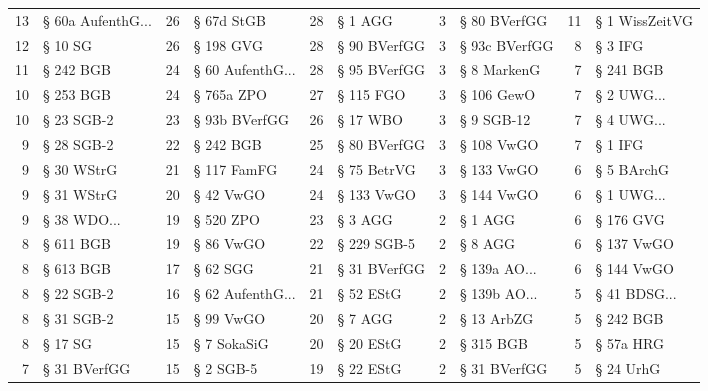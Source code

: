 \begin{tabular}{rlrlrlrlrl}
       13 & § 60a AufenthG... &        26 &         § 67d StGB &        28 &       § 1 AGG &         3 &   § 80 BVerfGG &        11 & § 1 WissZeitVG \\
       12 &             § 10 SG &        26 &          § 198 GVG &        28 &  § 90 BVerfGG &         3 &  § 93c BVerfGG &         8 &        § 3 IFG \\
       11 &           § 242 BGB &        24 & § 60 AufenthG... &        28 &  § 95 BVerfGG &         3 &    § 8 MarkenG &         7 &      § 241 BGB \\
       10 &           § 253 BGB &        24 &         § 765a ZPO &        27 &     § 115 FGO &         3 &     § 106 GewO &         7 &   § 2 UWG... \\
       10 &          § 23 SGB-2 &        23 &      § 93b BVerfGG &        26 &      § 17 WBO &         3 &     § 9 SGB-12 &         7 &   § 4 UWG... \\
        9 &          § 28 SGB-2 &        22 &          § 242 BGB &        25 &  § 80 BVerfGG &         3 &     § 108 VwGO &         7 &        § 1 IFG \\
        9 &          § 30 WStrG &        21 &        § 117 FamFG &        24 &   § 75 BetrVG &         3 &     § 133 VwGO &         6 &     § 5 BArchG \\
        9 &          § 31 WStrG &        20 &          § 42 VwGO &        24 &    § 133 VwGO &         3 &     § 144 VwGO &         6 &   § 1 UWG... \\
        9 &       § 38 WDO... &        19 &          § 520 ZPO &        23 &       § 3 AGG &         2 &        § 1 AGG &         6 &      § 176 GVG \\
        8 &           § 611 BGB &        19 &          § 86 VwGO &        22 &   § 229 SGB-5 &         2 &        § 8 AGG &         6 &     § 137 VwGO \\
        8 &           § 613 BGB &        17 &           § 62 SGG &        21 &  § 31 BVerfGG &         2 & § 139a AO... &         6 &     § 144 VwGO \\
        8 &          § 22 SGB-2 &        16 & § 62 AufenthG... &        21 &     § 52 EStG &         2 & § 139b AO... &         5 & § 41 BDSG... \\
        8 &          § 31 SGB-2 &        15 &          § 99 VwGO &        20 &       § 7 AGG &         2 &     § 13 ArbZG &         5 &      § 242 BGB \\
        8 &             § 17 SG &        15 &        § 7 SokaSiG &        20 &     § 20 EStG &         2 &      § 315 BGB &         5 &      § 57a HRG \\
        7 &        § 31 BVerfGG &        15 &          § 2 SGB-5 &        19 &     § 22 EStG &         2 &   § 31 BVerfGG &         5 &      § 24 UrhG \\
\bottomrule
\end{tabular}


